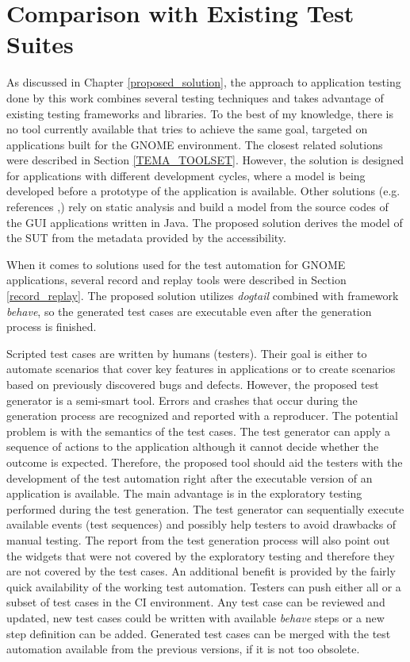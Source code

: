 \section{Comparison with Existing Test Suites}
As discussed in Chapter \ref{proposed_solution}, the approach to application testing done by this work combines several testing techniques and takes advantage of existing testing frameworks and libraries. To the best of my knowledge, there is no tool currently available that tries to achieve the same goal, targeted on applications built for the GNOME environment. The closest related solutions were described in Section \ref{TEMA_TOOLSET}. However, the solution is designed for applications with different development cycles, where a model is being developed before a prototype of the application is available. Other solutions (e.g. references \cite{ReisJacinto2018Aetw},\cite{ArltS2012LSAf}) rely on static analysis and build a model from the source codes of the GUI applications written in Java. The proposed solution derives the model of the SUT from the metadata provided by the accessibility.

When it comes to solutions used for the test automation for GNOME applications, several record and replay tools were described in Section \ref{record_replay}. The proposed solution utilizes \textit{dogtail} combined with framework \textit{behave}, so the generated test cases are executable even after the generation process is finished.

Scripted test cases are written by humans (testers). Their goal is either to automate scenarios that cover key features in applications or to create scenarios based on previously discovered bugs and defects. However, the proposed test generator is a semi-smart tool. Errors and crashes that occur during the generation process are recognized and reported with a reproducer. The potential problem is with the semantics of the test cases. The test generator can apply a sequence of actions to the application although it cannot decide whether the outcome is expected. Therefore, the proposed tool should aid the testers with the development of the test automation right after the executable version of an application is available. The main advantage is in the exploratory testing performed during the test generation. The test generator can sequentially execute available events (test sequences) and possibly help testers to avoid drawbacks of manual testing. The report from the test generation process will also point out the widgets that were not covered by the exploratory testing and therefore they are not covered by the test cases. An additional benefit is provided by the fairly quick availability of the working test automation. Testers can push either all or a subset of test cases in the CI environment. Any test case can be reviewed and updated, new test cases could be written with available \textit{behave} steps or a new step definition can be added. Generated test cases can be merged with the test automation available from the previous versions, if it is not too obsolete.

